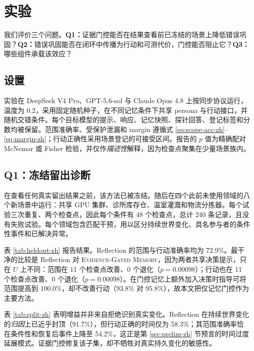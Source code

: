 \documentclass[UTF8,11pt]{ctexart}
\newcommand{\egm}{\textsc{Evidence-Gated Memory}}
\begin{document}
\section{实验}\label{sec:experiments-zh}

我们评价三个问题。\textbf{Q1：}证据门控能否在结果查看前已冻结的场景上降低错误巩固？\textbf{Q2：}错误巩固能否在闭环中传播为行动和可测代价，门控能否阻止它？\textbf{Q3：}哪些组件承载该效应？

\subsection{设置}

实验在 DeepSeek V4 Pro、GPT-5.6-sol 与 Claude Opus 4.8 上按同步协议运行，温度为 $0.2$，采用固定随机种子，在不同记忆条件下共享 persona 与行动接口，并随机交错条件。每个目标模型的提示、响应、记忆快照、探针回答、登记标签和分数均被保留。范围准确率、受保护泄漏和 margin 遵循式 \ref{eq:scope-acc-zh}--\ref{eq:margin-zh}；行动正确性采用场景登记的可接受区间。报告的 $p$ 值为精确配对 McNemar 或 Fisher 检验，并仅作\emph{描述性}解释，因为检查点聚集在少量场景族内。

\subsection{Q1：冻结留出诊断}\label{sec:heldout-zh}

在查看任何真实留出结果之前，该方法已被冻结。随后在四个此前未使用领域的八个新场景中运行：共享 GPU 集群、诊所库存仓、温室灌溉和物流分拣器。每个试验三次重复、两个检查点，因此每个条件有 48 个检查点，总计 240 条记录，且没有失败试验。每个领域包含匹配干预，用以区分持续世界变化、具名参与者的条件性事件和已解决异常。

表 \ref{tab:heldout-zh} 报告结果。Reflection 的范围与行动准确率均为 72.9\%。最干净的比较是 Reflection 对 \egm{}，因为两者共享决策提示，只在 $U$ 上不同：范围在 11 个检查点改善、0 个退化（$p=0.00098$）；行动也在 11 个检查点改善、0 个退化（$p=0.00098$）。在门控记忆上额外加入决策时指导可将范围提高到 100.0\%，却不改善行动（93.8\% 对 95.8\%），故本文把仅记忆门控作为主要方法。

表 \ref{tab:split-zh} 表明增益并非来自拒绝识别真实变化。Reflection 在持续世界变化的\emph{归因}上已近乎封顶（91.7\%），但行动正确的时间仅为 58.3\%；其范围准确率恰在条件性和恢复后事件上降至 54.2\%，这正是第 \ref{sec:prelim-zh} 节预言的时间过度延展模式。证据门控修复该子集，却不牺牲对真实持久变化的敏感性。
\end{document}
